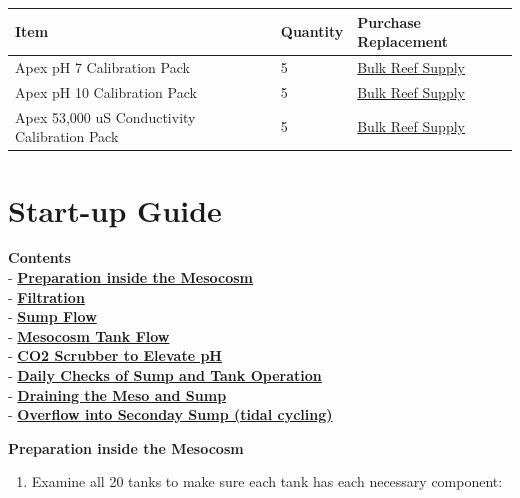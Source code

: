 \documentclass[
]{book}
\providecommand{\tightlist}{%
  \setlength{\itemsep}{0pt}\setlength{\parskip}{0pt}}
\begin{document}
\begin{longtable}[]{@{}lll@{}}
\toprule
Item & Quantity & Purchase Replacement \\
\midrule
\endhead
Apex pH 7 Calibration Pack & 5 & \href{https://www.bulkreefsupply.com/probe-calibration-kit-ph-7-0-ph-10-0-salinity-53000us-neptune-systems.html}{Bulk Reef Supply} \\
Apex pH 10 Calibration Pack & 5 & \href{https://www.bulkreefsupply.com/probe-calibration-kit-ph-7-0-ph-10-0-salinity-53000us-neptune-systems.html}{Bulk Reef Supply} \\
Apex 53,000 uS Conductivity Calibration Pack & 5 & \href{https://www.bulkreefsupply.com/probe-calibration-kit-ph-7-0-ph-10-0-salinity-53000us-neptune-systems.html}{Bulk Reef Supply} \\
\bottomrule
\end{longtable}

\hypertarget{start-up-guide}{%
\chapter{Start-up Guide}\label{start-up-guide}}

\textbf{Contents}\\
- \protect\hyperlink{Preparation}{\textbf{Preparation inside the Mesocosm}}\\
- \protect\hyperlink{Filtration}{\textbf{Filtration}}\\
- \protect\hyperlink{Sump_Flow}{\textbf{Sump Flow}}\\
- \protect\hyperlink{Meso_Flow}{\textbf{Mesocosm Tank Flow}}\\
- \protect\hyperlink{CO2_Scrubber}{\textbf{CO2 Scrubber to Elevate pH}}\\
- \protect\hyperlink{Daily_Checks}{\textbf{Daily Checks of Sump and Tank Operation}}\\
- \protect\hyperlink{Draining_Sump}{\textbf{Draining the Meso and Sump}}\\
- \protect\hyperlink{Overflow_into_Secondary_Sump}{\textbf{Overflow into Seconday Sump (tidal cycling)}}

\textbf{Preparation inside the Mesocosm}

\begin{enumerate}
\def\labelenumi{\arabic{enumi}.}
\tightlist
\item
  Examine all 20 tanks to make sure each tank has each necessary component:
\end{enumerate}
\end{document}
